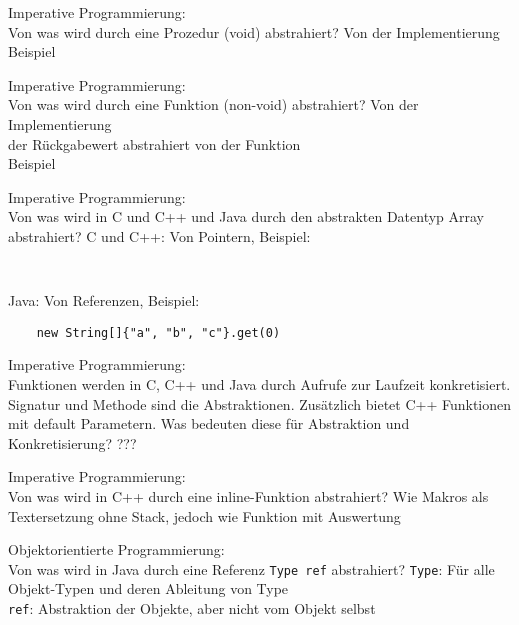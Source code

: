\begin{card}
	Imperative Programmierung:\\
	Von was wird durch eine Prozedur (void) abstrahiert?
	\hr
	Von der Implementierung\\
	Beispiel
\end{card}

\begin{card}
	Imperative Programmierung:\\
	Von was wird durch eine Funktion (non-void) abstrahiert?
	\hr
	Von der Implementierung\\
	der Rückgabewert abstrahiert von der Funktion\\
	Beispiel
\end{card}

\begin{card}
	Imperative Programmierung:\\
	Von was wird in C und C++ und Java durch den abstrakten Datentyp Array abstrahiert?
	\hr
	C und C++: Von Pointern, Beispiel: 
	\begin{lstlisting}
	
	\end{lstlisting}
	
	Java: Von Referenzen, Beispiel: \begin{lstlisting}
	new String[]{"a", "b", "c"}.get(0)
	\end{lstlisting}
	
\end{card}

\begin{card}
	Imperative Programmierung:\\
	Funktionen werden in C, C++ und Java durch Aufrufe zur Laufzeit konkretisiert. Signatur und Methode sind die Abstraktionen. Zusätzlich bietet C++ Funktionen mit default Parametern. Was bedeuten diese für Abstraktion und Konkretisierung?
	\hr
	???
\end{card}

\begin{card}
	Imperative Programmierung:\\
	Von was wird in C++ durch eine inline-Funktion abstrahiert?
	\hr
	Wie Makros als Textersetzung ohne Stack, jedoch wie Funktion mit Auswertung
\end{card}

\begin{card}
	Objektorientierte Programmierung:\\
	Von was wird in Java durch eine Referenz \texttt{Type ref} abstrahiert?
	\hr
	\texttt{Type}: Für alle Objekt-Typen und deren Ableitung von Type\\
	\texttt{ref}: Abstraktion der Objekte, aber nicht vom Objekt selbst
\end{card}

